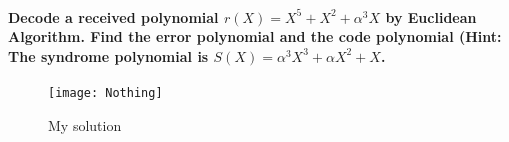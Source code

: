 \documentclass[Main]{subfiles}
\begin{document}
\paragraph{Decode a received polynomial $r(X) = X^5 + X^2 + \alpha^3X$ by Euclidean
Algorithm. 
Find the error polynomial and the code polynomial (Hint: The syndrome polynomial is $S(X) = \alpha^3 X^3 + \alpha X^2 + X$.}



\begin{figure}[H]
\centering
\texttt{[image: Nothing]}
\caption{My solution}
\end{figure}
\end{document}
